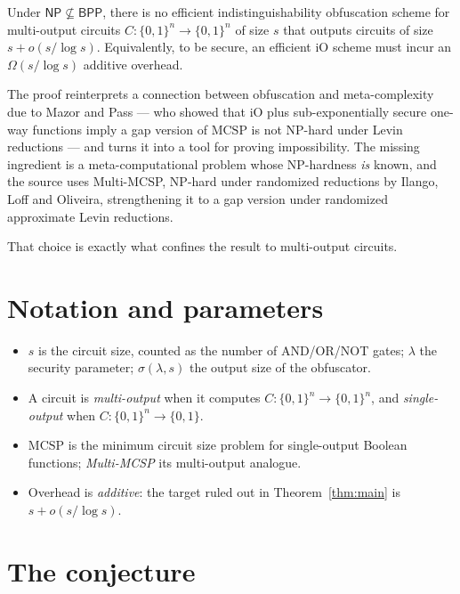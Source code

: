 \documentclass{conjura-conjecture}
\newcommand{\Om}{\Omega}
\newcommand{\bits}{\{0,1\}}
\newcommand{\NP}{\mathsf{NP}}
\newcommand{\BPP}{\mathsf{BPP}}
\newcommand{\MCSP}{\mathrm{MCSP}}
\begin{document}
\begin{theorem}\label{thm:main}
Under $\NP \not\subseteq \BPP$, there is no efficient indistinguishability
obfuscation scheme for multi-output circuits $C : \bits^{n} \to
\bits^{n}$ of size $s$ that outputs circuits of size $s + o(s/\log s)$.
Equivalently, to be secure, an efficient iO scheme must incur an
$\Om(s/\log s)$ additive overhead.
\end{theorem}

The proof reinterprets a connection between obfuscation and
meta-complexity due to Mazor and Pass --- who showed that iO plus
sub-exponentially secure one-way functions imply a gap version of $\MCSP$
is not NP-hard under Levin reductions --- and turns it into a tool for
proving impossibility. The missing ingredient is a meta-computational
problem whose NP-hardness \emph{is} known, and the source uses
Multi-MCSP, NP-hard under randomized reductions by Ilango, Loff and
Oliveira, strengthening it to a gap version under randomized approximate
Levin reductions.

That choice is exactly what confines the result to multi-output circuits.

\section{Notation and parameters}\label{sec:notation}

\begin{itemize}[nosep]
  \item $s$ is the circuit size, counted as the number of AND/OR/NOT
    gates; $\lambda$ the security parameter; $\sigma(\lambda,s)$ the
    output size of the obfuscator.
  \item A circuit is \emph{multi-output} when it computes $C : \bits^{n}
    \to \bits^{n}$, and \emph{single-output} when $C : \bits^{n} \to
    \bits$.
  \item $\MCSP$ is the minimum circuit size problem for single-output
    Boolean functions; \emph{Multi-MCSP} its multi-output analogue.
  \item Overhead is \emph{additive}: the target ruled out in
    Theorem~\ref{thm:main} is $s + o(s/\log s)$.
\end{itemize}

\section{The conjecture}\label{sec:conjectures}
\end{document}
